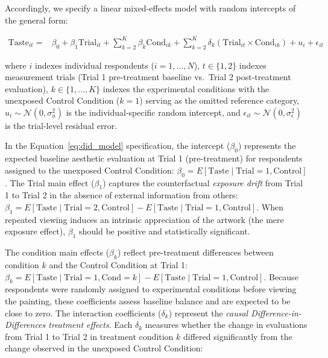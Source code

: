 \documentclass[12pt, letterpaper]{article}
\begin{document}
Accordingly, we specify a linear mixed-effects model with random intercepts of the general form:

\begin{equation}
\begin{split}
\text{Taste}_{it} = {} & \beta_0 + \beta_{1} \text{Trial}_{it} + \sum_{k=2}^{K} \beta_{k} \text{Cond}_{ik} + \sum_{k=2}^{K} \delta_{k} (\text{Trial}_{it} \times \text{Cond}_{ik}) + u_i + \epsilon_{it}
\end{split}
\label{eq:did_model}
\end{equation}

where $i$ indexes individual respondents ($i = 1, \dots, N$), $t \in \{1, 2\}$ indexes measurement trials (Trial 1 pre-treatment baseline vs.\ Trial 2 post-treatment evaluation), $k \in \{1, \dots, K\}$ indexes the experimental conditions with the unexposed Control Condition ($k = 1$) serving as the omitted reference category, $u_i \sim \mathcal{N}(0, \sigma^2_u)$ is the individual-specific random intercept, and $\epsilon_{it} \sim \mathcal{N}(0, \sigma^2_\epsilon)$ is the trial-level residual error.

In the Equation~\ref{eq:did_model} specification, the intercept ($\beta_0$) represents the expected baseline aesthetic evaluation at Trial 1 (pre-treatment) for respondents assigned to the unexposed Control Condition: $\beta_0 = E[\text{Taste} \mid \text{Trial} = 1, \text{Control}]$. The Trial main effect ($\beta_{1}$) captures the counterfactual \textit{exposure drift} from Trial 1 to Trial 2 in the absence of external information from others: $\beta_{1} = E[\text{Taste} \mid \text{Trial} = 2, \text{Control}] - E[\text{Taste} \mid \text{Trial} = 1, \text{Control}]$. When repeated viewing induces an intrinsic appreciation of the artwork (the mere exposure effect), $\beta_{1}$ should be positive and statistically significant.

The condition main effects ($\beta_k$) reflect pre-treatment differences between condition $k$ and the Control Condition at Trial 1: $\beta_k = E[\text{Taste} \mid \text{Trial} = 1, \text{Cond} = k] - E[\text{Taste} \mid \text{Trial} = 1, \text{Control}]$. Because respondents were randomly assigned to experimental conditions before viewing the painting, these coefficients assess baseline balance and are expected to be close to zero. The interaction coefficients ($\delta_k$) represent the \textit{causal Difference-in-Differences treatment effects}. Each $\delta_k$ measures whether the change in evaluations from Trial 1 to Trial 2 in treatment condition $k$ differed significantly from the change observed in the unexposed Control Condition:
\end{document}
